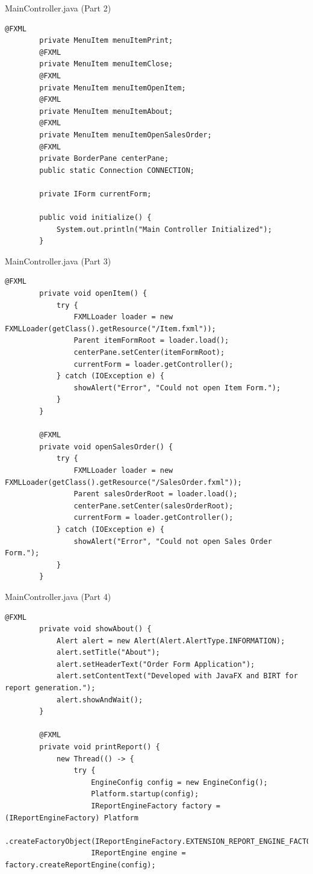 \documentclass[aspectratio=169, table]{beamer}
\begin{document}
\begin{frame}[fragile]{MainController.java (Part 2)}
	\vspace{20pt}
	\begin{lstlisting}[style=JavaStyle]
		@FXML
		private MenuItem menuItemPrint;
		@FXML
		private MenuItem menuItemClose;
		@FXML
		private MenuItem menuItemOpenItem;
		@FXML
		private MenuItem menuItemAbout;
		@FXML
		private MenuItem menuItemOpenSalesOrder;
		@FXML
		private BorderPane centerPane;
		public static Connection CONNECTION;
		
		private IForm currentForm;
		
		public void initialize() {
			System.out.println("Main Controller Initialized");
		}
	\end{lstlisting}
\end{frame}

\begin{frame}[fragile]{MainController.java (Part 3)}
	\vspace{20pt}
	\begin{lstlisting}[style=JavaStyle]
		@FXML
		private void openItem() {
			try {
				FXMLLoader loader = new FXMLLoader(getClass().getResource("/Item.fxml"));
				Parent itemFormRoot = loader.load();
				centerPane.setCenter(itemFormRoot);
				currentForm = loader.getController();
			} catch (IOException e) {
				showAlert("Error", "Could not open Item Form.");
			}
		}
		
		@FXML
		private void openSalesOrder() {
			try {
				FXMLLoader loader = new FXMLLoader(getClass().getResource("/SalesOrder.fxml"));
				Parent salesOrderRoot = loader.load();
				centerPane.setCenter(salesOrderRoot);
				currentForm = loader.getController();
			} catch (IOException e) {
				showAlert("Error", "Could not open Sales Order Form.");
			}
		}
	\end{lstlisting}
\end{frame}

\begin{frame}[fragile]{MainController.java (Part 4)}
	\vspace{20pt}
	\begin{lstlisting}[style=JavaStyle]
		@FXML
		private void showAbout() {
			Alert alert = new Alert(Alert.AlertType.INFORMATION);
			alert.setTitle("About");
			alert.setHeaderText("Order Form Application");
			alert.setContentText("Developed with JavaFX and BIRT for report generation.");
			alert.showAndWait();
		}
		
		@FXML
		private void printReport() {
			new Thread(() -> {
				try {
					EngineConfig config = new EngineConfig();
					Platform.startup(config);
					IReportEngineFactory factory = (IReportEngineFactory) Platform
					.createFactoryObject(IReportEngineFactory.EXTENSION_REPORT_ENGINE_FACTORY);
					IReportEngine engine = factory.createReportEngine(config);
				\end{lstlisting}
			\end{frame}
			
\end{document}
